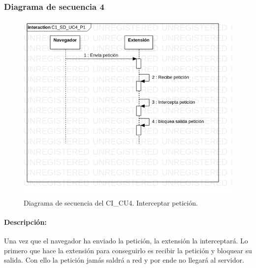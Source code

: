 \documentclass[12pt, a4paper, titlepage]{report}
\begin{document}
    			\subsubsection{Diagrama de secuencia 4}
    			    \begin{figure}[H]
    				    \begin{center} \includegraphics[width=15cm]{./imagenes/Disenio/Componente_1/C1_SD_UC4_P1.png}
    				    \caption[Diagrama de secuencia 4 del Componente I]{Diagrama de secuencia del CI\_CU4. Interceptar petición.}
    			        \end{center}
    			    \end{figure}
    			    
    			    \paragraph{Descripción:}
    			    Una vez que el navegador ha enviado la petición, la extensión la interceptará. Lo primero que hace la extensión para conseguirlo es recibir la petición y bloquear su salida. Con ello la petición jamás saldrá a red y por ende no llegará al servidor.
    			  
\end{document}
